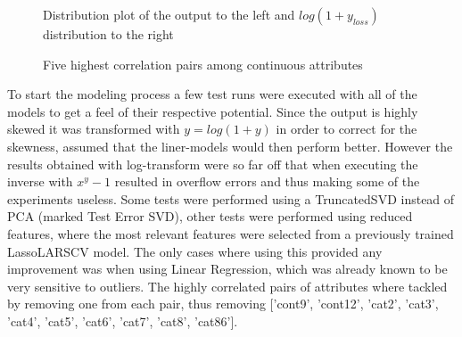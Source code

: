 \documentclass[a4paper]{article}
\begin{document}
\begin{figure}[H]
\centering
{}
\caption{Distribution plot of the output to the left and $log(1 + y_{loss})$ distribution to the right}
\label{fig:loss}
\end{figure}
\begin{figure}[H]
\centering
{}
\caption{Five highest correlation pairs among continuous attributes}
\label{fig:con-corr}
\end{figure}
To start the modeling process a few test runs were executed with all of the models to get a feel of their respective potential. Since the output is highly skewed it was transformed with $y=log(1 + y)$ in order to correct for the skewness, assumed that the liner-models would then perform better. However the results obtained with log-transform were so far off that when executing the inverse with $x^y - 1$ resulted in overflow errors and thus making some of the experiments useless.  Some tests were performed using a TruncatedSVD instead of PCA (marked Test Error SVD), other tests were performed using reduced features, where the most relevant features were selected from a previously trained LassoLARSCV model.  The only cases where using this provided any improvement was when using Linear Regression, which was already known to be very sensitive to outliers.
The highly correlated pairs of attributes where tackled by removing one from each pair, thus removing ['cont9', 'cont12', 'cat2', 'cat3', 'cat4', 'cat5', 'cat6', 'cat7', 'cat8', 'cat86'].
\end{document}
